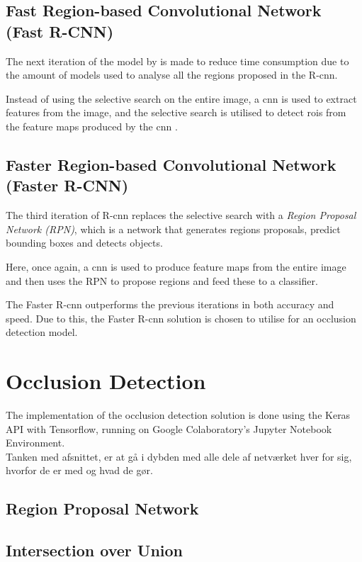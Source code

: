 \subsection{Fast Region-based Convolutional Network (Fast R-CNN)}
The next iteration of the model by \cite{Girshick2015} is made to reduce time consumption due to the amount of models used to analyse all the regions proposed in the R-\gls{cnn}.

Instead of using the selective search on the entire image, a \gls{cnn} is used to extract features from the image, and the selective search is utilised to detect \gls{roi}s from the feature maps produced by the \gls{cnn} \citep{Girshick2015}.

\subsection{Faster Region-based Convolutional Network (Faster R-CNN)}
The third iteration of R-\gls{cnn} replaces the selective search with a \textit{Region Proposal Network (RPN)}, which is a network that generates regions proposals, predict bounding boxes and detects objects.

Here, once again, a \gls{cnn} is used to produce feature maps from the entire image and then uses the RPN to propose regions and feed these to a classifier.

The Faster R-\gls{cnn} outperforms the previous iterations in both accuracy and speed. Due to this, the Faster R-\gls{cnn} solution is chosen to utilise for an occlusion detection model.

\section{Occlusion Detection}
The implementation of the occlusion detection solution is done using the Keras API with Tensorflow, running on Google Colaboratory's Jupyter Notebook Environment.\\

Tanken med afsnittet, er at gå i dybden med alle dele af netværket hver for sig, hvorfor de er med og hvad de gør.

\subsection{Region Proposal Network}

\subsection{Intersection over Union}
